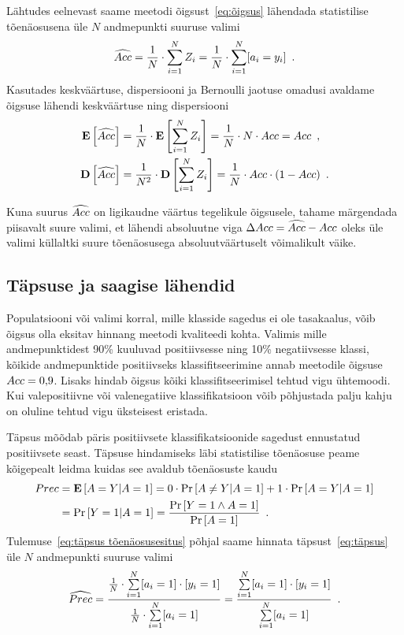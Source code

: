 Lähtudes eelnevast saame meetodi õigsust~\eqref{eq:õigsus} lähendada statistilise tõenäosusena üle $N$ andmepunkti suuruse valimi
\begin{equation}
    \label{eq:õigsus lähend}
    \widehat{Acc} = \frac{1}{N} \cdot \sum^{N}_{i = 1} Z_i = \frac{1}{N} \cdot \sum^{N}_{i = 1} [a_i = y_i] \enspace.
\end{equation}
Kasutades keskväärtuse, dispersiooni ja Bernoulli jaotuse omadusi avaldame õigsuse lähendi keskväärtuse ning dispersiooni
\begin{align*}
    \operatorname*{\mathbf{E}}\left[\widehat{Acc}\right] &= \frac{1}{N} \cdot \operatorname*{\mathbf{E}}\left[\sum^{N}_{i = 1} Z_i\right] = \frac{1}{N} \cdot N \cdot Acc = Acc \enspace, \\
    \operatorname*{\mathbf{D}}\left[\widehat{Acc}\right] &= \frac{1}{N^2} \cdot \operatorname*{\mathbf{D}}\left[\sum^{N}_{i = 1} Z_i\right] = \frac{1}{N} \cdot Acc \cdot (1 - Acc) \enspace.
\end{align*}

Kuna suurus $\widehat{Acc}$ on ligikaudne väärtus tegelikule õigsusele, tahame märgendada piisavalt suure valimi, et lähendi absoluutne viga $\Delta Acc = \widehat{Acc} - Acc$ oleks üle valimi küllaltki suure tõenäosusega absoluutväärtuselt võimalikult väike.

\subsection{Täpsuse ja saagise lähendid}
Populatsiooni või valimi korral, mille klasside sagedus ei ole tasakaalus, võib õigsus olla eksitav hinnang meetodi kvaliteedi kohta. Valimis mille andmepunktidest 90\% kuuluvad positiivsesse ning 10\% negatiivsesse klassi, kõikide andmepunktide positiivseks klassifitseerimine annab meetodile õigsuse $Acc = 0{,}9$. Lisaks hindab õigsus kõiki klassifitseerimisel tehtud vigu ühtemoodi. Kui valepositiivne või valenegatiive klassifikatsioon võib põhjustada palju kahju on oluline tehtud vigu üksteisest eristada.

Täpsus mõõdab päris positiivsete klassifikatsioonide sagedust ennustatud positiivsete seast. Täpsuse hindamiseks läbi statistilise tõenäosuse peame kõigepealt leidma kuidas see avaldub tõenäosuste kaudu
\begin{align}
    Prec &= \operatorname*{\mathbf{E}}\left[A = Y | A = 1\right] = 0 \cdot \Pr\left[A \neq Y | A = 1\right] + 1 \cdot \Pr\left[A = Y | A = 1\right] \nonumber\\
    &= \Pr\left[Y = 1 | A = 1\right] = \frac{\Pr\left[Y = 1 \land A = 1\right]}{\Pr\left[A = 1\right]} \enspace. \label{eq:täpsus tõenäosusesitus}
\end{align}
Tulemuse~\eqref{eq:täpsus tõenäosusesitus} põhjal saame hinnata täpsust~\eqref{eq:täpsus} üle $N$ andmepunkti suuruse valimi
\begin{equation}
    \label{eq:täpsus lähend}
    \widehat{Prec} = \frac{\frac{1}{N} \cdot \sum \limits_{i = 1}^{N} [a_i = 1] \cdot [y_i = 1]}{\frac{1}{N} \cdot \sum \limits_{i = 1}^{N} [a_i = 1]} = \frac{\sum \limits_{i = 1}^{N} [a_i = 1] \cdot [y_i = 1]}{\sum \limits_{i = 1}^{N} [a_i = 1]}\enspace.
\end{equation}

